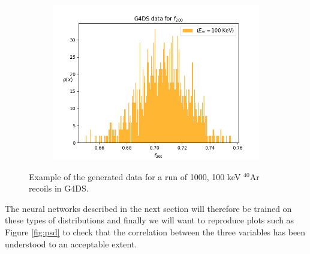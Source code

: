 \documentclass[11pt]{article} %
\begin{document}
\begin{figure}[H]\ContinuedFloat
\centering
\begin{minipage}{.5\textwidth}
  \centering
  \begin{subfigure}{.9\textwidth}
      \includegraphics[width=\textwidth]{./images/f200like_100.png}
  \end{subfigure}
\end{minipage}
\caption{Example of the generated data for a run of 1000, 100 keV $^{40}\mathrm{\text{Ar}}$ recoils in G4DS.}
\label{fig:example_vars}
\end{figure}
\par The neural networks described in the next section will therefore be trained on these types of distributions and finally we will want to reproduce
plots such as Figure \ref{fig:psd} to check that the correlation between the three variables has been understood to an acceptable extent.
\end{document}
